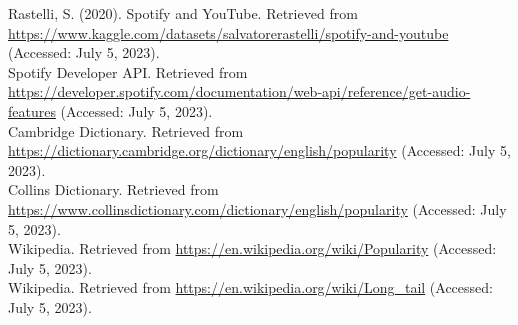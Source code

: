 \documentclass[11pt]{article} %
\begin{document}
\newpage

\begin{thebibliography}{9}
	 Rastelli, S. (2020). Spotify and YouTube. Retrieved from \href{https://www.kaggle.com/datasets/salvatorerastelli/spotify-and-youtube}{https://www.kaggle.com/datasets/salvatorerastelli/spotify-and-youtube} (Accessed: July 5, 2023).\\
	 Spotify Developer API. Retrieved from \href{https://developer.spotify.com/documentation/web-api/reference/get-audio-features}{https://developer.spotify.com/documentation/web-api/reference/get-audio-features} (Accessed: July 5, 2023).\\
	 Cambridge Dictionary. Retrieved from \href{https://dictionary.cambridge.org/dictionary/english/popularity}{https://dictionary.cambridge.org/dictionary/english/popularity} (Accessed: July 5, 2023).\\
	 Collins Dictionary. Retrieved from \href{https://www.collinsdictionary.com/dictionary/english/popularity}{https://www.collinsdictionary.com/dictionary/english/popularity} (Accessed: July 5, 2023).\\
	 Wikipedia. Retrieved from \href{https://en.wikipedia.org/wiki/Popularity}{https://en.wikipedia.org/wiki/Popularity} (Accessed: July 5, 2023).\\
	 Wikipedia. Retrieved from \href{https://en.wikipedia.org/wiki/Long_tail}{https://en.wikipedia.org/wiki/Long\_tail} (Accessed: July 5, 2023).\\
\end{thebibliography}
\end{document}
